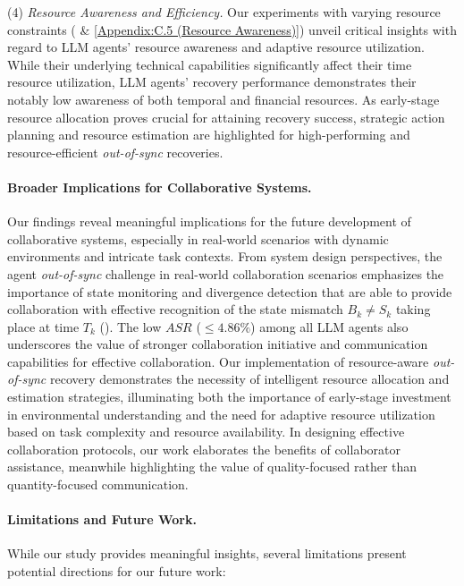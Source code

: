 (4) \textit{Resource Awareness and Efficiency.}
Our experiments with varying resource constraints ( \& \ref{Appendix:C.5 (Resource Awareness)}) unveil critical insights with regard to LLM agents' resource awareness and adaptive resource utilization. While their underlying technical capabilities significantly affect their time resource utilization, LLM agents' recovery performance demonstrates their notably low awareness of both temporal and financial resources. As early-stage resource allocation proves crucial for attaining recovery success, strategic action planning and resource estimation are highlighted for high-performing and resource-efficient \textit{out-of-sync} recoveries. 



\paragraph{Broader Implications for Collaborative Systems.}
Our findings reveal meaningful implications for the future development of collaborative systems, especially in real-world scenarios with dynamic environments and intricate task contexts. 
From system design perspectives, the agent \textit{out-of-sync} challenge in real-world collaboration scenarios emphasizes the importance of state monitoring and divergence detection that are able to provide collaboration with effective recognition of the state mismatch $B_k \neq S_k$ taking place at time $T_k$ ().
The low $ASR$ ($\leq 4.86\%$) among all LLM agents also underscores the value of stronger collaboration initiative and communication capabilities for effective collaboration.
Our implementation of resource-aware \textit{out-of-sync} recovery demonstrates the necessity of intelligent resource allocation and estimation strategies, illuminating both the importance of early-stage investment in environmental understanding and the need for adaptive resource utilization based on task complexity and resource availability. In designing effective collaboration protocols, our work elaborates the benefits of collaborator assistance, meanwhile highlighting the value of quality-focused rather than quantity-focused communication. 

\paragraph{Limitations and Future Work.}
While our study provides meaningful insights, several limitations present potential directions for our future work:

